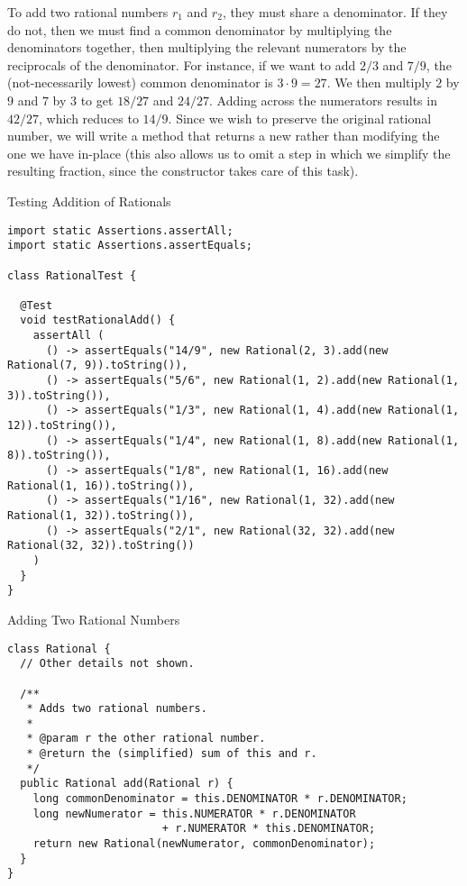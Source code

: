 To add two rational numbers $r_1$ and $r_2$, they must share a denominator. If they do not, then we must find a common denominator by multiplying the denominators together, then multiplying the relevant numerators by the reciprocals of the denominator. For instance, if we want to add $2/3$ and $7/9$, the (not-necessarily lowest) common denominator is $3\cdot{9} = 27$. We then multiply $2$ by $9$ and $7$ by $3$ to get $18/27$ and $24/27$. Adding across the numerators results in $42/27$, which reduces to $14/9$. Since we wish to preserve the original rational number, we will write a method that returns a new  rather than modifying the one we have in-place (this also allows us to omit a step in which we simplify the resulting fraction, since the constructor takes care of this task).

\begin{cl}{Testing Addition of Rationals}
\begin{lstlisting}[language=MyJava]
import static Assertions.assertAll;
import static Assertions.assertEquals;

class RationalTest {

  @Test
  void testRationalAdd() {
    assertAll (
      () -> assertEquals("14/9", new Rational(2, 3).add(new Rational(7, 9)).toString()),
      () -> assertEquals("5/6", new Rational(1, 2).add(new Rational(1, 3)).toString()),
      () -> assertEquals("1/3", new Rational(1, 4).add(new Rational(1, 12)).toString()),
      () -> assertEquals("1/4", new Rational(1, 8).add(new Rational(1, 8)).toString()),
      () -> assertEquals("1/8", new Rational(1, 16).add(new Rational(1, 16)).toString()),
      () -> assertEquals("1/16", new Rational(1, 32).add(new Rational(1, 32)).toString()),
      () -> assertEquals("2/1", new Rational(32, 32).add(new Rational(32, 32)).toString())
    )
  }
}
\end{lstlisting}
\end{cl}

\begin{cl}{Adding Two Rational Numbers}
\begin{lstlisting}[language=MyJava]
class Rational {
  // Other details not shown.

  /**
   * Adds two rational numbers.
   *
   * @param r the other rational number.
   * @return the (simplified) sum of this and r.
   */
  public Rational add(Rational r) {
    long commonDenominator = this.DENOMINATOR * r.DENOMINATOR;
    long newNumerator = this.NUMERATOR * r.DENOMINATOR 
                        + r.NUMERATOR * this.DENOMINATOR;
    return new Rational(newNumerator, commonDenominator);
  }
}
\end{lstlisting}
\end{cl}

